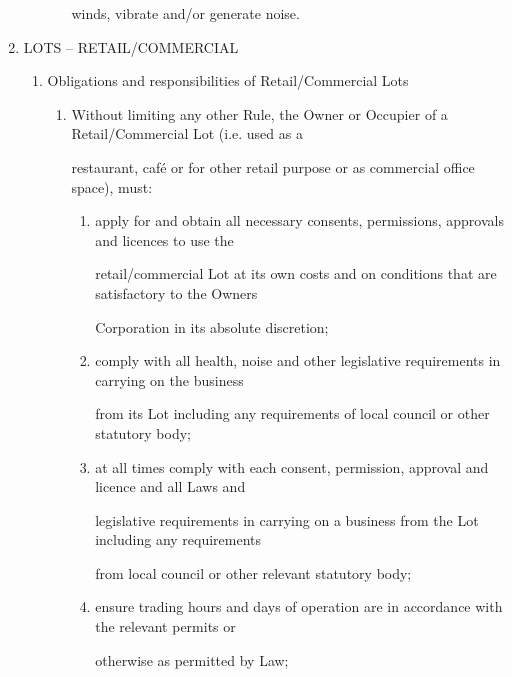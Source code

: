 \documentclass{article}
\begin{document}
\begin{enumerate}[label=\arabic*.]
\begin{enumerate}[label=\arabic{enumi}.\arabic*.]
\begin{enumerate}[label=(\arabic*)]
{\fontsize{10.02}{1}winds, vibrate and/or generate noise. }

\end{enumerate}
\end{enumerate}
\item {\fontsize{9.99}{1} LOTS – RETAIL/COMMERCIAL }

\begin{enumerate}[label=\arabic{enumi}.\arabic*.]
\item {\fontsize{9.99}{1} Obligations and responsibilities of Retail/Commercial Lots }

\begin{enumerate}[label=(\arabic*)]
\item {\fontsize{9.962}{1} Without limiting any other Rule, the Owner or Occupier of a Retail/Commercial Lot (i.e. used as a }

{\fontsize{10.02}{1}restaurant, café or for other retail purpose or as commercial office space), must: }

\begin{enumerate}[label=(\alph*)]
\item {\fontsize{9.962}{1} apply for and obtain all necessary consents, permissions, approvals and licences to use the }

{\fontsize{10.02}{1}retail/commercial Lot at its own costs and on conditions that are satisfactory to the Owners }

{\fontsize{10.02}{1}Corporation in its absolute discretion; }

\item {\fontsize{9.962}{1} comply with all health, noise and other legislative requirements in carrying on the business }

{\fontsize{10.02}{1}from its Lot including any requirements of local council or other statutory body; }

\item {\fontsize{9.962}{1} at all times comply with each consent, permission, approval and licence and all Laws and }

{\fontsize{10.02}{1}legislative requirements in carrying on a business from the Lot including any requirements }

{\fontsize{10.02}{1}from local council or other relevant statutory body; }

\item {\fontsize{9.962}{1} ensure trading hours and days of operation are in accordance with the relevant permits or }

{\fontsize{10.02}{1}otherwise as permitted by Law; }


\end{enumerate}
\end{enumerate}
\end{enumerate}
\end{enumerate}
\end{document}
